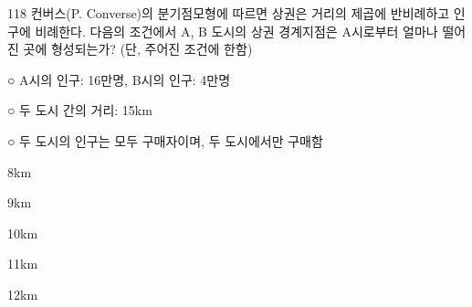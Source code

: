 \begin{question}{118}
컨버스(P. Converse)의 분기점모형에 따르면 상권은 거리의 제곱에 반비례하고 인구에 비례한다. 다음의 조건에서 A, B 도시의 상권 경계지점은 A시로부터 얼마나 떨어진 곳에 형성되는가? (단, 주어진 조건에 한함)
\begin{framedtext}
○ A시의 인구: 16만명, B시의 인구: 4만명 \par
○ 두 도시 간의 거리: 15km \par
○ 두 도시의 인구는 모두 구매자이며, 두 도시에서만 구매함
\end{framedtext}
\begin{choices}
  \item 8km
  \item 9km
  \item 10km
  \item 11km
  \item 12km
\end{choices}
\end{question}
